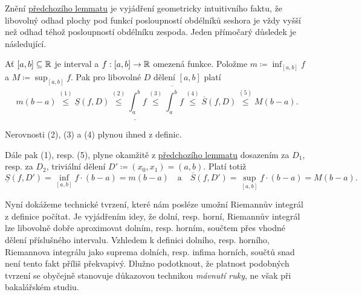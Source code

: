 Znění \hyperref[lem:vlastnosti-deleni]{předchozího lemmatu} je vyjádření
geometricky intuitivního faktu, že libovolný odhad plochy pod funkcí
posloupností obdélníků seshora je vždy vyšší než odhad téhož posloupností
obdélníku zespoda. Jeden přímočarý důsledek je následující.

\begin{corollary}{}{}
 Ať $[a,b] \subseteq \mathbb{R}$ je interval a $f:[a,b] \to \mathbb{R}$ omezená funkce. Položme
 $m \coloneqq \inf_{[a,b]}f$ a $M \coloneqq \sup_{[a,b]}f$. Pak pro libovolné
 $D$ dělení $[a,b]$ platí
 \[
  m(b-a) \overset{(1)}{ \leq } \underline{S}(f,D) \overset{(2)}{ \leq }
  \underline{\int_{a}^{b}} f \overset{(3)}{ \leq }  \overline{\int_{a}^{b}} f
  \overset{(4)}{ \leq } \overline{S}(f,D) \overset{(5)}{ \leq } M(b-a).
 \]
\end{corollary}
\begin{corproof}
 Nerovnosti (2), (3) a (4) plynou ihned z definic.

 Dále pak (1), resp. (5), plyne okamžitě z
 \hyperref[lem:vlastnosti-deleni]{předchozího lemmatu} dosazením za $D_1$, resp.
 za $D_2$, triviální dělení $D' \coloneqq (x_0,x_1) = (a,b)$. Platí totiž
 \[
  \underline{S}(f,D') = \inf_{[a,b]}f \cdot (b-a) = m(b-a) \quad \text{a} \quad
  \overline{S}(f,D') = \sup_{[a,b]}f \cdot (b-a) = M(b-a).
 \]
\end{corproof}

Nyní dokážeme technické tvrzení, které nám posléze umožní Riemannův integrál z
definice počítat. Je vyjádřením idey, že dolní, resp. horní, Riemannův integrál
lze libovolně dobře aproximovat dolním, resp. horním, součtem přes vhodné dělení
příslušného intervalu. Vzhledem k definici dolního, resp. horního, Riemannova
integrálu jako suprema dolních, resp. infima horních, součtů snad není tento
fakt příliš překvapivý. Dlužno podotknout, že platnost podobných tvrzení se
obyčejně stanovuje důkazovou technikou \emph{mávnutí ruky}, ne však při
bakalářském studiu.


